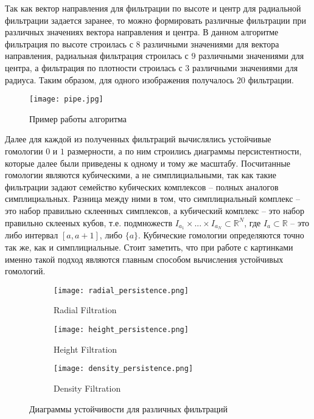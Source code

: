 Так как вектор направления для фильтрации по высоте и центр для радиальной фильтрации задается заранее, то можно формировать различные фильтрации при различных значениях вектора направления и центра. В данном алгоритме фильтрация по высоте строилась с $8$ различными значениями для вектора направления, радиальная фильтрация строилась с $9$ различными значениями для центра, а фильтрация по плотности строилась с $3$ различными значениями для радиуса. Таким образом, для одного изображения получалось $20$ фильтрации.

\begin{figure}[!htbp]
	\begin{center}
		\texttt{[image: pipe.jpg]}\\
		\caption{Пример работы алгоритма}
		\label{example}
	\end{center}
\end{figure}

Далее для каждой из полученных фильтраций вычислялись устойчивые гомологии $0$ и $1$ размерности, а по ним строились диаграммы персистентности, которые далее были приведены к одному и тому же масштабу. Посчитанные гомологии являются кубическими, а не симплициальными, так как такие фильтрации задают семейство кубических комплексов -- полных аналогов симплициальных. Разница между ними в том, что симплициальный комплекс -- это набор правильно склеенных симплексов, а кубический комплекс -- это набор правильно склееных кубов, т.е. подмножеств $I_{a_1} \times ... \times I_{a_N} \subset \mathbb{R}^N$, где $I_a \subset \mathbb{R}$ -- это либо интервал $[a, a+1]$, либо $\{a\}$. Кубические гомологии определяются точно так же, как и симплициальные. Стоит заметить, что при работе с картинками именно такой подход являются главным способом вычисления устойчивых гомологий.

\begin{figure}[!htbp]
	\begin{subfigure}{.33\textwidth}
		\centering
		\texttt{[image: radial\_persistence.png]}\\
		\caption{Radial Filtration}
	\end{subfigure}%
	\begin{subfigure}{.33\textwidth}
		\centering
		\texttt{[image: height\_persistence.png]}\\
		\caption{Height Filtration}
	\end{subfigure}%
	\begin{subfigure}{.33\textwidth}
		\centering
		\texttt{[image: density\_persistence.png]}\\
		\caption{Density Filtration}
	\end{subfigure}%
	\caption{Диаграммы устойчивости для различных фильтраций}
	\label{persistences}
\end{figure}

